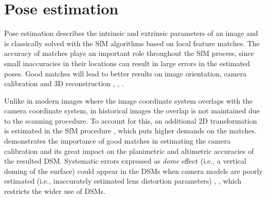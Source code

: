 \section{Pose estimation}
Pose estimation describes the intrinsic and extrinsic parameters of an image and is classically solved with the \ac{SfM} algorithms \cite{snavely2006photo,deseilligny2011apero,schonberger2016structure} based on local feature matches. 
The accuracy of matches plays an important role throughout the \ac{SfM} process, since small inaccuracies in their locations can result in large errors in the estimated poses. 
Good matches will lead to better results on image orientation, camera calibration and 3D reconstruction \cite{lindenberger2021pixel}, \cite{sarlin2021back}, \cite{truong2018second}.

\par
Unlike in modern images where the image coordinate system overlaps with the camera coordinate system, in historical images the overlap is not maintained due to the scanning procedure. To account for this, an additional 2D transformation is estimated in the \ac{SfM} procedure \cite{article}, which puts higher demands on the matches. %
\cite{giordano2018toward} demonstrates the importance of good matches in estimating the camera calibration and its great impact on the planimetric and altimetric accuracies of the resulted \ac{DSM}. 
Systematic errors expressed as \textit{dome} effect (i.e., a vertical doming of the surface) could appear in the \ac{DSM}s when camera models are poorly estimated {(i.e., inaccurately estimated lens distortion parameters)} \cite{wackrow2008minimising}, \cite{james2014mitigating}, which restricts the wider use of \ac{DSM}s. 



